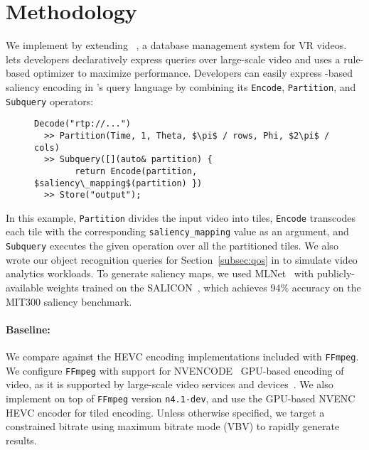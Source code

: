 
\section{Methodology}
\label{sec:vignette-methodology}

We implement \name by extending \lightdb~\cite{lightdb}, a database management system for VR videos.
\lightdb{} lets developers declaratively express queries over large-scale video and uses a rule-based optimizer to maximize performance.
Developers can easily express \hevc-based saliency encoding in \lightdb's query language by combining its \texttt{Encode}, \texttt{Partition}, and \texttt{Subquery} operators:
\begin{figure}
\begin{lstlisting}[style=VRQL]
Decode("rtp://...")
  >> Partition(Time, 1, Theta, $\pi$ / rows, Phi, $2\pi$ / cols)
  >> Subquery([](auto& partition) {
        return Encode(partition, $saliency\_mapping$(partition) })
  >> Store("output");
\end{lstlisting}
\end{figure}

\noindent In this example, \texttt{Partition} divides the input video into tiles, \texttt{Encode} transcodes each tile with the corresponding \texttt{saliency\_mapping} value as an argument, and  \texttt{Subquery} executes the given operation over all the partitioned tiles.
We also wrote our object recognition queries for Section~\ref{subsec:qos} in \lightdb to simulate video analytics workloads.
To generate saliency maps, we used MLNet~\cite{mlnet2016} with publicly-available weights trained on the SALICON~\cite{huang2015salicon}, which achieves 94\% accuracy on the MIT300 saliency benchmark.

\paragraph{Baseline:} We compare \name against the HEVC encoding implementations included with \texttt{FFmpeg}.
We configure \texttt{FFmpeg} with support for NVENCODE~\cite{nvenc} GPU-based encoding of \hevc video, as it is supported by large-scale video services and devices~\cite{de2016large}.
We also implement \nameCompress on top of \texttt{FFmpeg} version \texttt{n4.1-dev}, and use the GPU-based NVENC HEVC encoder for tiled encoding.
Unless otherwise specified, we target a constrained bitrate using maximum bitrate mode (VBV) to rapidly generate results.

